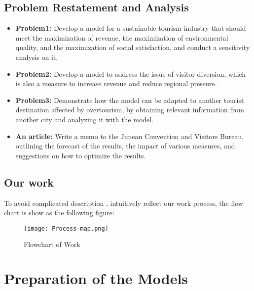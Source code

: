 \documentclass[12pt]{article}  %
\begin{document}
\subsection{Problem Restatement and Analysis}
\begin{itemize}
    \item \textbf{Problem1: }Develop a model for a sustainable tourism industry that should meet the maximization of revenue, the maximization of environmental quality, and the maximization of social satisfaction, and conduct a sensitivity analysis on it.
    \item \textbf{Problem2: }Develop a model to address the issue of visitor diversion, which is also a measure to increase revenue and reduce regional pressure.
    \item \textbf{Problem3: }Demonstrate how the model can be adapted to another tourist destination affected by overtourism, by obtaining relevant information from another city and analyzing it with the model.
    \item \textbf{An article: }Write a memo to the Juneau Convention and Visitors Bureau, outlining the forecast of the results, the impact of various measures, and suggestions on how to optimize the results.
\end{itemize}

\subsection{Our work}
To avoid complicated description , intuitively reflect our work process, the flow chart is show
as the following figure:
\begin{figure}[H]
	\centering
	\texttt{[image: Process-map.png]}
	\caption{Flowchart of Work}\label{fig:Process-map}
\end{figure}

\section{Preparation of the Models}
\end{document}
